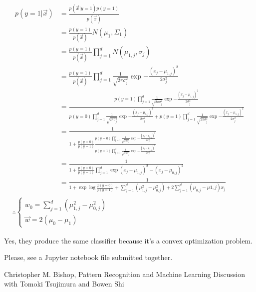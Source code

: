 \documentclass{introtosml}
\newcommand{\x}{\vec{x}}
\newcommand{\w}{\vec{w}}
\newcommand\gauss[1]{\prod_{j=1}^d \frac{1}{\sqrt{2 \pi \sigma_j^2}} \exp{- \frac{(x_j - \mu_{#1,j})^2}{2 \sigma_j^2}}}
\newcommand\cgauss[1]{p(y=#1)\gauss{#1}}
\newcommand\pbias{\frac{p(y=0)}{p(y=1)}}
\begin{document}
\maketitle

\begin{p}
  \item
    \begin{gather}
      \begin{aligned}
        p(y=1|\x)
        & = \frac{p(\x|y=1)p(y=1)}{p(\x)} \\
        & = \frac{p(y=1)}{p(\x)} N(\mu_1, \Sigma_1) \\
        & = \frac{p(y=1)}{p(\x)} \prod_{j=1}^d N(\mu_{1,j}, \sigma_j) \\
        & = \frac{p(y=1)}{p(\x)} \gauss{1} \\
        & = \frac{\cgauss{1}}{\cgauss{0} + \cgauss{1}} \\
        & = \frac{1}{1 + \pbias \frac{\cgauss{0}}{\cgauss{1}}} \\
        & = \frac{1}{1 + \pbias \prod_{j=1}^d \exp{(x_j - \mu_{1,j})^2 - (x_j - \mu_{0,j})^2}} \\
        & = \frac{1}{1 +
            \exp{\log \pbias + \sum_{j=1}^d (\mu_{1,j}^2 - \mu_{0,j}^2)
            + 2 \sum_{j=1}^d (\mu_{0,j} - \mu{1,j}) x_j}}
      \end{aligned} \\
      \therefore \begin{cases}
        w_0 = \sum_{j=1}^d (\mu_{1,j}^2 - \mu_{0,j}^2) \\
        \w = 2 (\mu_0 - \mu_1)
      \end{cases}
    \end{gather}

  \item
    Yes, they produce the same classifier because it's a convex optimization problem.

  \item
    Please, see a Jupyter notebook file submitted together.
\end{p}

\begin{thebibliography}{9}
   Christopher M. Bishop, Pattern Recognition and Machine Learning
   Discussion with Tomoki Tsujimura and Bowen Shi
\end{thebibliography}
\end{document}
